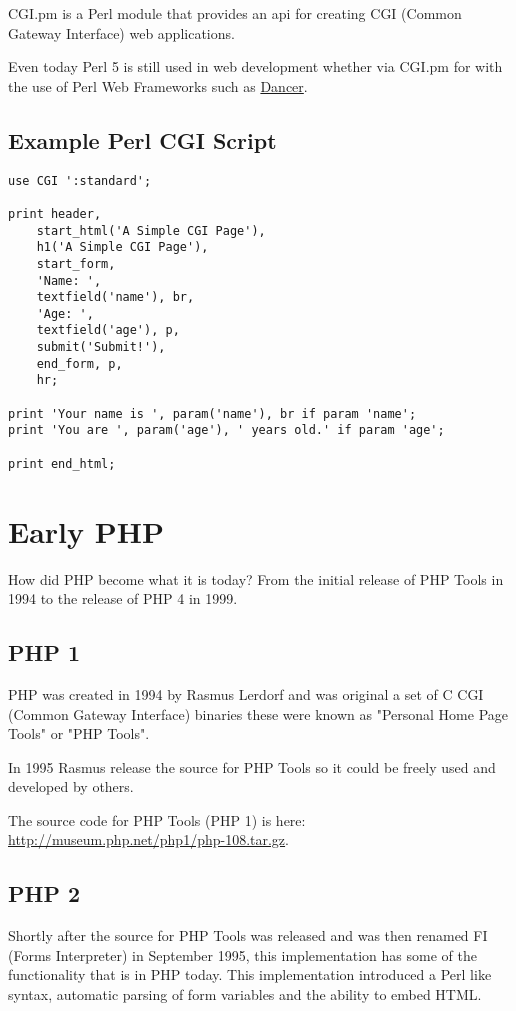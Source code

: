\documentclass{book}
\begin{document}
CGI.pm is a Perl module that provides an api for creating CGI (Common Gateway Interface) web applications.

Even today Perl 5 is still used in web development whether via CGI.pm for with the use of Perl Web Frameworks such as \href{http://perldancer.org}{Dancer}.

\subsection{Example Perl CGI Script}
\begin{lstlisting}
use CGI ':standard';
 
print header,
    start_html('A Simple CGI Page'),
    h1('A Simple CGI Page'),
    start_form,
    'Name: ',
    textfield('name'), br,
    'Age: ',
    textfield('age'), p,
    submit('Submit!'),
    end_form, p,
    hr;
 
print 'Your name is ', param('name'), br if param 'name';
print 'You are ', param('age'), ' years old.' if param 'age';
 
print end_html;

\end{lstlisting}
\newpage

\section{Early PHP}
How did PHP become what it is today? From the initial release of PHP Tools in 1994 to the release of PHP 4 in 1999.

\subsection{PHP 1}
PHP was created in 1994 by Rasmus Lerdorf and was original a set of C CGI (Common Gateway Interface) binaries these were known as "Personal Home Page Tools" or "PHP Tools".

In 1995 Rasmus release the source for PHP Tools so it could be freely used and developed by others.

The source code for PHP Tools (PHP 1) is here: \href{http://museum.php.net/php1/php-108.tar.gz}{http://museum.php.net/php1/php-108.tar.gz}.

\subsection{PHP 2}
Shortly after the source for PHP Tools was released and was then renamed FI (Forms Interpreter) in September 1995, this implementation has some of the functionality that is in PHP today. This implementation introduced a Perl like syntax, automatic parsing of form variables and the ability to embed HTML.
\end{document}
